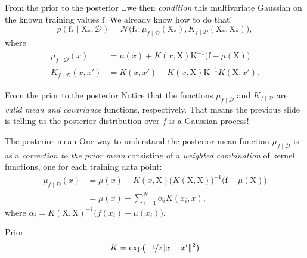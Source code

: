 \documentclass[xcolor={dvipsnames},hyperref={breaklinks=true},12pt]{beamer}
\newcommand{\given}{\mid}
\newcommand{\mc}[1]{\mathcal{#1}}
\newcommand{\data}{\mc{D}}
\newcommand{\inv}{^{-1}}
\newcommand{\mat}[1]{\bm{\mathrm{#1}}}
\renewcommand{\vec}[1]{\bm{\mathrm{#1}}}
\newcommand{\emphr}[1]{{\textcolor{or}{\itshape #1}}}
\begin{document}
\begin{frame}{From the prior to the posterior}
  \dots we then \emphr{condition} this multivariate Gaussian on the known
  training values $\vec{f}$.  We already know how to do that!
  \begin{equation*}
    p(\vec{f}_\ast \given \mat{X}_\ast, \data) =
    \mc{N}
    \bigl(
    \vec{f}_\ast;
    \mu_{f \given \data}(\mat{X}_\ast)
    ,
    K_{f \given \data}(\mat{X}_\ast, \mat{X}_\ast)
    \bigr),
  \end{equation*}
  where
  \begin{align*}
    \mu_{f \given \data}(x)
    &=
    \mu(x) +
    K(x, \mat{X})
    \mat{K}\inv
    \bigl(\vec{f} - \mu(\mat{X})\bigr)
    \\
    K_{f \given \data}(x, x')
    &=
    K(x, x')
    -
    K(x, \mat{X})
    \mat{K}\inv
    K(\mat{X}, x').
  \end{align*}
\end{frame}

\begin{frame}{From the prior to the posterior}
  Notice that the functions $\mu_{f \given \data}$ and $K_{f \given
    \data}$ are \emphr{valid mean and covariance} functions,
  respectively.  That means the previous slide is telling us
  the posterior distribution over $f$ is a Gaussian process!
\end{frame}

\begin{frame}{The posterior mean}
  One way to understand the posterior mean function $\mu_{f \given
    \data}$ is as a \emphr{correction to the prior mean} consisting of
  a \emphr{weighted combination} of kernel functions, one for each
  training data point:
  \begin{align*}
    \mu_{f \given D}(x)
    &=
    \mu(x) +
    K(x, \mat{X})
    \bigl(K(\mat{X}, \mat{X})\bigr)^{-1}
    \bigl(\vec{f} - \mu(\mat{X})\bigr)
    \\
    &=
    \mu(x) +
    \sum_{i = 1}^N \alpha_i K(x_i, x),
  \end{align*}
  where $\alpha_i = K(\mat{X}, \mat{X})^{-1} \bigl(f(x_i) - \mu(x_i) \bigr)$.
\end{frame}

\begin{frame}{Prior}
  \hspace*{-1.5em}
  \begin{equation*}
    K = \exp\bigl(-\nicefrac{1}{2}\lVert x - x' \rVert^2\bigr)
  \end{equation*}
\end{frame}
\end{document}
